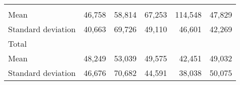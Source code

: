 \begin{tabular}{llllll}
  \multicolumn{1}{r}{} &
  \multicolumn{1}{r}{} &
  \multicolumn{1}{r}{} &
  \multicolumn{1}{r}{} \\
\multicolumn{1}{l}{\hspace{4em}Mean} &
  \multicolumn{1}{|r}{46,758} &
  \multicolumn{1}{r}{58,814} &
  \multicolumn{1}{r}{67,253} &
  \multicolumn{1}{r}{114,548} &
  \multicolumn{1}{r}{47,829} \\
\multicolumn{1}{l}{\hspace{4em}Standard deviation} &
  \multicolumn{1}{|r}{40,663} &
  \multicolumn{1}{r}{69,726} &
  \multicolumn{1}{r}{49,110} &
  \multicolumn{1}{r}{46,601} &
  \multicolumn{1}{r}{42,269} \\
\multicolumn{1}{l}{\hspace{3em}Total} &
  \multicolumn{1}{|r}{} &
  \multicolumn{1}{r}{} &
  \multicolumn{1}{r}{} &
  \multicolumn{1}{r}{} &
  \multicolumn{1}{r}{} \\
\multicolumn{1}{l}{\hspace{4em}Mean} &
  \multicolumn{1}{|r}{48,249} &
  \multicolumn{1}{r}{53,039} &
  \multicolumn{1}{r}{49,575} &
  \multicolumn{1}{r}{42,451} &
  \multicolumn{1}{r}{49,032} \\
\multicolumn{1}{l}{\hspace{4em}Standard deviation} &
  \multicolumn{1}{|r}{46,676} &
  \multicolumn{1}{r}{70,682} &
  \multicolumn{1}{r}{44,591} &
  \multicolumn{1}{r}{38,038} &
  \multicolumn{1}{r}{50,075} \\
\cline{1-6}
\end{tabular}

